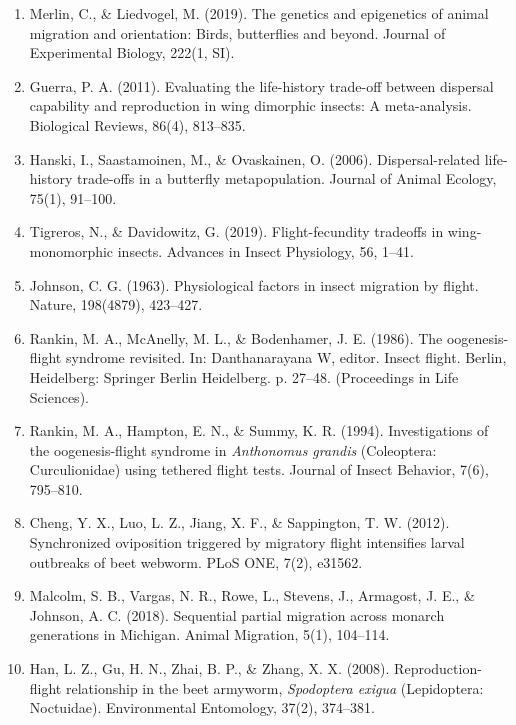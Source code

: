 \documentclass[lineno]{wiley-article}
\begin{document}
\begin{enumerate}
\item Merlin, C., \& Liedvogel, M. (2019). The genetics and epigenetics of animal migration and orientation: Birds, butterflies and beyond. Journal of Experimental Biology, 222(1, SI).

\item Guerra, P. A. (2011). Evaluating the life-history trade-off between dispersal capability and reproduction in wing dimorphic insects: A meta-analysis. Biological Reviews, 86(4), 813–835.

\item Hanski, I., Saastamoinen, M., \& Ovaskainen, O. (2006). Dispersal-related life-history trade-offs in a butterfly metapopulation. Journal of Animal Ecology, 75(1), 91–100.

\item Tigreros, N., \& Davidowitz, G. (2019). Flight-fecundity tradeoffs in wing-monomorphic insects. Advances in Insect Physiology, 56, 1–41.

\item Johnson, C. G. (1963). Physiological factors in insect migration by flight. Nature, 198(4879), 423–427.

\item Rankin, M. A., McAnelly, M. L., \& Bodenhamer, J. E. (1986). The oogenesis-flight syndrome revisited. In: Danthanarayana W, editor. Insect flight. Berlin, Heidelberg: Springer Berlin Heidelberg. p. 27–48. (Proceedings in Life Sciences).

\item Rankin, M. A., Hampton, E. N., \& Summy, K. R. (1994). Investigations of the oogenesis-flight syndrome in \textit{Anthonomus grandis} (Coleoptera: Curculionidae) using tethered flight tests. Journal of Insect Behavior, 7(6), 795–810.

\item Cheng, Y. X., Luo, L. Z., Jiang, X. F., \& Sappington, T. W. (2012). Synchronized oviposition triggered by migratory flight intensifies larval outbreaks of beet webworm. PLoS ONE, 7(2), e31562.

\item Malcolm, S. B., Vargas, N. R., Rowe, L., Stevens, J., Armagost, J. E., \& Johnson, A. C. (2018). Sequential partial migration across monarch generations in Michigan. Animal Migration, 5(1), 104–114.

\item Han, L. Z., Gu, H. N., Zhai, B. P., \& Zhang, X. X. (2008). Reproduction-flight relationship in the beet armyworm, \textit{Spodoptera exigua} (Lepidoptera: Noctuidae). Environmental Entomology, 37(2), 374–381.


\end{enumerate}
\end{document}
